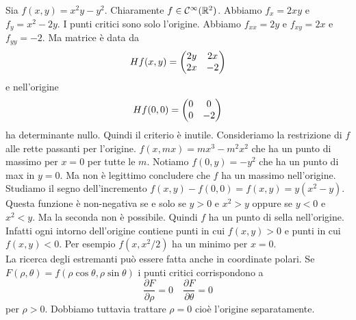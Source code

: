 \documentclass[a4paper]{article}
\begin{document}
\begin{radioactive}
\begin{snippetexample}{}
    Sia \(f(x,y) = x^2y - y^2\).
    Chiaramente \(f\in\mathcal{C}^\infty(\mathbb{R}^2)\).
    Abbiamo \(f_x = 2xy\) e \(f_y = x^2-2y\). I punti critici
    sono solo l'origine.
    Abbiamo \(f_{xx} = 2y\) e \(f_{xy} = 2x\) e \(f_{yy} = -2\). Ma matrice è data da
    \[
        H f(x,y) = \begin{pmatrix}
            2y & 2x \\ 2x & -2
        \end{pmatrix}
    \]
    e nell'origine
    \[
        H f(0,0) = \begin{pmatrix}
            0 & 0 \\ 0 & -2
        \end{pmatrix}
    \]
    ha determinante nullo. Quindi il criterio è inutile.
    Consideriamo la restrizione di \(f\) alle rette passanti per l'origine.
    \(f(x,mx)=mx^3 - m^2x^2\) che ha un punto di massimo per \(x=0\) per tutte le \(m\).
    Notiamo \(f(0,y) = -y^2\) che ha un punto di max in \(y=0\).
    Ma non è legittimo concludere che \(f\) ha un massimo nell'origine.
    Studiamo il segno dell'incremento \(f(x,y) - f(0,0) = f(x,y) = y(x^2-y)\).
    Questa funzione è non-negativa se e solo se \(y>0\) e \(x^2>y\)
    oppure se \(y<0\) e \(x^2<y\).
    Ma la seconda non è possibile. Quindi \(f\) ha un punto di sella
    nell'origine. Infatti ogni intorno
    dell'origine contiene punti in cui \(f(x,y)>0\) e punti in cui \(f(x,y)<0\).
    Per esempio \(f(x, x^2/2)\) ha un minimo per \(x=0\). \\
    La ricerca degli estremanti può essere fatta anche in coordinate polari.
    Se \(F(\rho, \theta) = f(\rho\cos\theta, \rho\sin\theta)\) i punti critici corrispondono
    a
    \[
        \frac{\partial F}{\partial \rho} = 0 \quad
        \frac{\partial F}{\partial \theta} = 0
    \]
    per \(\rho > 0\).
    Dobbiamo tuttavia trattare \(\rho=0\) cioè l'origine separatamente.
\end{snippetexample}
\end{radioactive}
\end{document}
